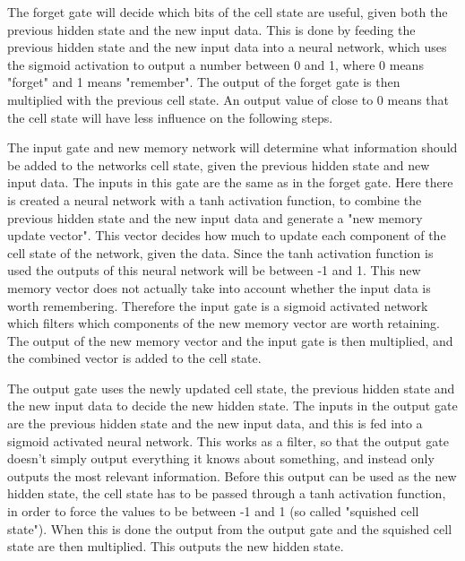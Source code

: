 The forget gate will decide which bits of the cell state are useful, given both the previous hidden state and the new input data. 
This is done by feeding the previous hidden state and the new input data into a neural network, which uses the sigmoid activation to output a number between 0 and 1, where 0 means "forget" and 1 means "remember". 
The output of the forget gate is then multiplied with the previous cell state. An output value of close to 0 means that the cell state will have less influence on the following steps. 

The input gate and new memory network will determine what information should be added to the networks cell state, given the previous hidden state and new input data. The inputs in this gate are the same as in the forget gate. 
Here there is created a neural network with a tanh activation function, to combine the previous hidden state and the new input data and generate a "new memory update vector". This vector decides how much to update each component of the cell state of the network, given the data. 
Since the tanh activation function is used the outputs of this neural network will be between -1 and 1. 
This new memory vector does not actually take into account whether the input data is worth remembering. 
Therefore the input gate is a sigmoid activated network which filters which components of the new memory vector are worth retaining. 
The output of the new memory vector and the input gate is then multiplied, and the combined vector is added to the cell state. 

The output gate uses the newly updated cell state, the previous hidden state and the new input data to decide the new hidden state. 
The inputs in the output gate are the previous hidden state and the new input data, and this is fed into a sigmoid activated neural network. 
This works as a filter, so that the output gate doesn't simply output everything it knows about something, and instead only outputs the most relevant information. 
Before this output can be used as the new hidden state, the cell state has to be passed through a tanh activation function, in order to force the values to be between -1 and 1 (so called "squished cell state"). 
When this is done the output from the output gate and the squished cell state are then multiplied. This outputs the new hidden state.  

